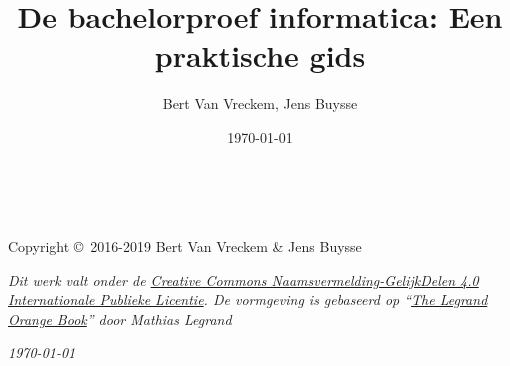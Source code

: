 \documentclass{hogent-report}
\author{Bert {Van Vreckem}, Jens Buysse}
\title{De bachelorproef informatica: Een praktische gids}
\date{\today}
\begin{document}
\inserttitlepage[maincolor]


\newpage
~\vfill
\thispagestyle{empty}

\noindent Copyright \copyright\ 2016-2019 Bert Van Vreckem \& Jens Buysse %

\noindent \textit{Dit werk valt onder de \href{http://creativecommons.org/licenses/by-sa/4.0/}{Creative Commons Naamsvermelding-GelijkDelen 4.0 Internationale Publieke Licentie}. De vormgeving is gebaseerd op ``\href{http://www.latextemplates.com/template/the-legrand-orange-book}{The Legrand Orange Book}'' door Mathias Legrand}

\noindent \textit{\today} %

\vspace{3cm}

\usechapterimagefalse

\tableofcontents %

\cleardoublepage %










\printbibliography[notkeyword=voorbeeld]
\end{document}
